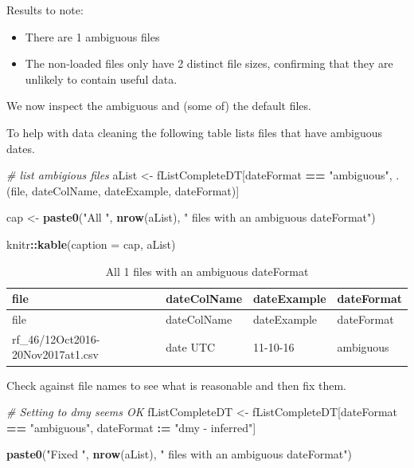 \documentclass[]{article}
\newenvironment{Shaded}{\begin{snugshade}}{\end{snugshade}}
\newcommand{\KeywordTok}[1]{\textcolor[rgb]{0.13,0.29,0.53}{\textbf{#1}}}
\newcommand{\DataTypeTok}[1]{\textcolor[rgb]{0.13,0.29,0.53}{#1}}
\newcommand{\StringTok}[1]{\textcolor[rgb]{0.31,0.60,0.02}{#1}}
\newcommand{\CommentTok}[1]{\textcolor[rgb]{0.56,0.35,0.01}{\textit{#1}}}
\newcommand{\OperatorTok}[1]{\textcolor[rgb]{0.81,0.36,0.00}{\textbf{#1}}}
\newcommand{\ErrorTok}[1]{\textcolor[rgb]{0.64,0.00,0.00}{\textbf{#1}}}
\newcommand{\NormalTok}[1]{#1}
\providecommand{\tightlist}{%
  \setlength{\itemsep}{0pt}\setlength{\parskip}{0pt}}
\begin{document}
Results to note:

\begin{itemize}
\tightlist
\item
  There are 1 ambiguous files
\item
  The non-loaded files only have 2 distinct file sizes, confirming that
  they are unlikely to contain useful data.
\end{itemize}

We now inspect the ambiguous and (some of) the default files.

To help with data cleaning the following table lists files that have
ambiguous dates.

\begin{Shaded}
\begin{Highlighting}[]
\CommentTok{# list ambigious files}
\NormalTok{aList <-}\StringTok{ }\NormalTok{fListCompleteDT[dateFormat }\OperatorTok{==}\StringTok{ "ambiguous"}\NormalTok{, .(file, dateColName, dateExample, dateFormat)]}

\NormalTok{cap <-}\StringTok{ }\KeywordTok{paste0}\NormalTok{(}\StringTok{"All "}\NormalTok{, }\KeywordTok{nrow}\NormalTok{(aList), }\StringTok{" files with an ambiguous dateFormat"}\NormalTok{)}

\NormalTok{knitr}\OperatorTok{::}\KeywordTok{kable}\NormalTok{(}\DataTypeTok{caption =}\NormalTok{ cap, aList)}
\end{Highlighting}
\end{Shaded}

\begin{longtable}[]{@{}llll@{}}
\caption{All 1 files with an ambiguous dateFormat}\tabularnewline
\toprule
file & dateColName & dateExample & dateFormat\tabularnewline
\midrule
\endfirsthead
\toprule
file & dateColName & dateExample & dateFormat\tabularnewline
\midrule
\endhead
rf\_46/12Oct2016-20Nov2017at1.csv & date UTC & 11-10-16 &
ambiguous\tabularnewline
\bottomrule
\end{longtable}

Check against file names to see what is reasonable and then fix them.

\begin{Shaded}
\begin{Highlighting}[]
\CommentTok{# Setting to dmy seems OK}
\NormalTok{fListCompleteDT <-}\StringTok{ }\NormalTok{fListCompleteDT[dateFormat }\OperatorTok{==}\StringTok{ "ambiguous"}\NormalTok{, dateFormat }\OperatorTok{:}\ErrorTok{=}\StringTok{ "dmy - inferred"}\NormalTok{]}

\KeywordTok{paste0}\NormalTok{(}\StringTok{"Fixed "}\NormalTok{, }\KeywordTok{nrow}\NormalTok{(aList), }\StringTok{" files with an ambiguous dateFormat"}\NormalTok{)}
\end{Highlighting}
\end{Shaded}
\end{document}
